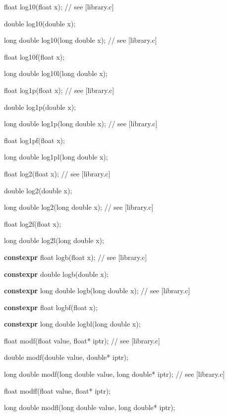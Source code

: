 \documentclass[prd,preprint,amsmath,amssymb,nofootinbib,eqsecnum]{revtex4-1}
\newcommand{\highlight}[1]{{\bf #1}}
\begin{document}
{\vspace{2ex}

float log10(float x); // see [library.c]

double log10(double x);

long double log10(long double x); // see [library.c]

float log10f(float x);

long double log10l(long double x);

\vspace{2ex}

float log1p(float x); // see [library.c]

double log1p(double x);

long double log1p(long double x); // see [library.c]

float log1pf(float x);

long double log1pl(long double x);

\vspace{2ex}

float log2(float x); // see [library.c]

double log2(double x);

long double log2(long double x); // see [library.c]

float log2f(float x);

long double log2l(long double x);

\vspace{2ex}

\highlight{constexpr} float logb(float x); // see [library.c]

\highlight{constexpr} double logb(double x);

\highlight{constexpr} long double logb(long double x); // see [library.c]

\highlight{constexpr} float logbf(float x);

\highlight{constexpr} long double logbl(long double x);

\vspace{2ex}

float modf(float value, float* iptr); // see [library.c]

double modf(double value, double* iptr);

long double modf(long double value, long double* iptr); // see [library.c]

float modff(float value, float* iptr);

long double modfl(long double value, long double* iptr);

\vspace{2ex}

}
\end{document}
